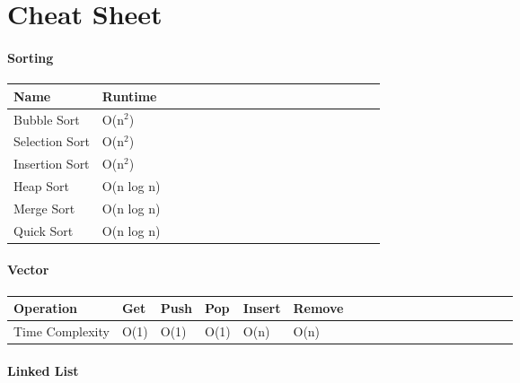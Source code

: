 \documentclass[11pt,oneside]{book}
\begin{document}
  \appendix
  \chapter{Cheat Sheet}\subsubsection{Sorting}

\begin{center}\begin{tabulary}{0.4\linewidth}{|l|l|l|l|l|l|l|l|l|l|l|l|l|l|l|l|l|l|l}\hline


  Name &
  Runtime\\
\hline


  Bubble Sort &
  O(n$^{2}$)\\

  Selection Sort &
  O(n$^{2}$)\\

  Insertion Sort &
  O(n$^{2}$)\\

  Heap Sort &
  O(n log n)\\

  Merge Sort &
  O(n log n)\\

  Quick Sort &
  O(n log n)\\

\hline\end{tabulary}\end{center}

\subsubsection{Vector}

\begin{center}\begin{tabulary}{0.4\linewidth}{|l|l|l|l|l|l|l|l|l|l|l|l|l|l|l|l|l|l|l}\hline


  Operation &
  Get &
  Push &
  Pop &
  Insert &
  Remove\\
\hline


  Time Complexity &
  O(1) &
  O(1) &
  O(1) &
  O(n) &
  O(n)\\

\hline\end{tabulary}\end{center}

\subsubsection{Linked List}
\end{document}
